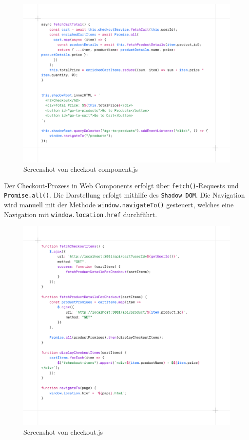 \documentclass[oneside]{ausarbeitung}
\begin{document}
\begin{figure}[H]
    \centering
    \includegraphics[width=\linewidth]{images/wcheckoutcomponent.png}
    \caption{Screenshot von checkout-component.js}
    \label{fig:wcheckout}
\end{figure}

Der Checkout-Prozess in Web Components erfolgt über \texttt{fetch()}-Requests und \texttt{Promise.all()}. Die Darstellung erfolgt mithilfe des \texttt{Shadow DOM}. Die Navigation wird manuell mit der Methode \texttt{window.navigateTo()} gesteuert, welches eine Navigation mit \texttt{window.location.href} durchführt.

\begin{figure}[H]
    \centering
    \includegraphics[width=\linewidth]{images/jqcheckout.png}
    \caption{Screenshot von checkout.js}
    \label{fig:wcheckout}
\end{figure}
\end{document}
